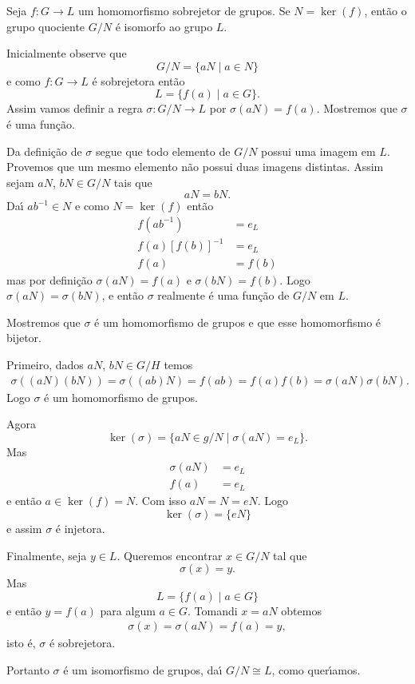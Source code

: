\begin{teorema}\label{primeiro_teorema_homomorfismo}
    Seja $f : G \to L$ um homomorfismo sobrejetor de grupos. Se $N = \ker(f)$, ent\~ao o grupo quociente $G/N$ \'e isomorfo ao grupo $L$.
\end{teorema}
\begin{prova}
    Inicialmente observe que
    \[
        G/N = \{aN \mid a \in N\}
    \]
    e como $f : G \to L$ \'e sobrejetora ent\~ao
    \[
        L = \{f(a) \mid a \in G\}.
    \]
    Assim vamos definir a regra $\sigma : G/N \to L$ por $\sigma(aN) = f(a)$. Mostremos que $\sigma$ \'e uma fun\c{c}\~ao.

    Da defini\c{c}\~ao de $\sigma$ segue que todo elemento de $G/N$ possui uma imagem em $L$. Provemos que um mesmo elemento n\~ao possui duas imagens distintas. Assim sejam $aN$, $bN \in G/N$ tais que
    \[
        aN = bN.
    \]
    Da{\'\i} $ab^{-1} \in N$ e como $N = \ker(f)$ ent\~ao
    \begin{align*}
        f(ab^{-1}) &= e_L\\
        f(a)[f(b)]^{-1} &= e_L\\
        f(a) &= f(b)
    \end{align*}
    mas por defini\c{c}\~ao $\sigma(aN) = f(a)$ e $\sigma(bN) = f(b)$. Logo $\sigma(aN) = \sigma(bN)$, e ent\~ao $\sigma$ realmente \'e uma fun\c{c}\~ao de $G/N$ em $L$.

    Mostremos que $\sigma$ \'e um homomorfismo de grupos e que esse homomorfismo \'e bijetor.

    Primeiro, dados $aN$, $bN \in G/H$ temos
    \begin{align*}
        \sigma((aN)(bN)) = \sigma((ab)N) = f(ab) = f(a)f(b) = \sigma(aN)\sigma(bN).
    \end{align*}
    Logo $\sigma$ \'e um homomorfismo de grupos.

    Agora
    \[
        \ker(\sigma) = \{aN \in g/N \mid \sigma(aN) = e_L\}.
    \]
    Mas
    \begin{align*}
        \sigma(aN) &= e_L\\
        f(a) &= e_L
    \end{align*}
    e ent\~ao $a \in \ker(f) = N$. Com isso $aN = N = eN$. Logo
    \[
        \ker(\sigma) = \{eN\}
    \]
    e assim $\sigma$ \'e injetora.

    Finalmente, seja $y \in L$. Queremos encontrar $x \in G/N$ tal que
    \[
        \sigma(x) = y.
    \]
    Mas
    \[
        L = \{f(a) \mid a \in G\}
    \]
    e ent\~ao $y = f(a)$ para algum $a \in G$. Tomandi $x = aN$ obtemos
    \begin{align*}
        \sigma(x) = \sigma(aN) = f(a) = y,
    \end{align*}
    isto \'e, $\sigma$ \'e sobrejetora.

    Portanto $\sigma$ \'e um isomorfismo de grupos, da{\'\i} $G/N \cong L$, como quer{\'\i}amos.
\end{prova}

